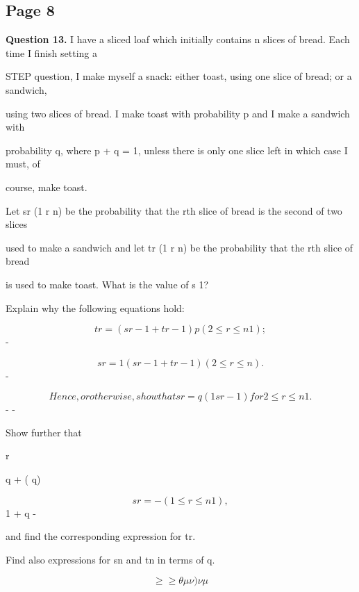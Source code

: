 \documentclass[12pt]{article}
\begin{document}
\subsection*{Page 8}
\begin{flushleft}
\bigskip\textbf{Question 13.} I have a sliced loaf which initially contains n slices of bread. Each time I finish setting a\par
STEP question, I make myself a snack: either toast, using one slice of bread; or a sandwich,\par
using two slices of bread. I make toast with probability p and I make a sandwich with\par
probability q, where p + q = 1, unless there is only one slice left in which case I must, of\par
course, make toast.\par
Let sr (1 \leq r \leq n) be the probability that the rth slice of bread is the second of two slices\par
used to make a sandwich and let tr (1 \leq r \leq n) be the probability that the rth slice of bread\par
is used to make toast. What is the value of s 1?\par
Explain why the following equations hold:\par
\[tr = (sr-1 + tr-1) p (2 \leq r \leq n 1) ;\]
-\par
\[sr = 1 (sr-1 + tr-1) (2 \leq r \leq n) .\]
-\par
\[Hence, or otherwise, show that sr = q(1 sr-1) for 2 \leq r \leq n 1 .\]
- -\par
Show further that\par
r\par
q + ( q)\par
\[sr = - (1 \leq r \leq n 1) ,\]
1 + q -\par
and find the corresponding expression for tr.\par
Find also expressions for sn and tn in terms of q.\par
\[\geq\geq\theta\mu\nu) \nu\mu\]
\end{flushleft}
\end{document}
